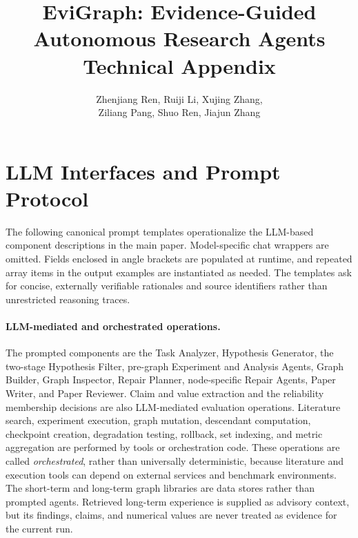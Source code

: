 
\setcounter{secnumdepth}{2}

\title{EviGraph: Evidence-Guided Autonomous Research Agents\\Technical Appendix}

\author{
    Zhenjiang Ren, Ruiji Li, Xujing Zhang,\\
    Ziliang Pang, Shuo Ren, Jiajun Zhang
}



\maketitle

\appendix
\fi

\ifappendixStandalone
  \newcommand{\mainref}[1]{\ref{main-#1}}
  \def\finishAppendixDocument{}
\else
  \newcommand{\mainref}[1]{\ref{#1}}
  \let\finishAppendixDocument\relax
\fi

\section{LLM Interfaces and Prompt Protocol}
\label{app:prompt-protocol}

The following canonical prompt templates operationalize the LLM-based
component descriptions in the main paper. Model-specific chat wrappers are omitted.
Fields enclosed in angle brackets are populated at runtime, and repeated array
items in the output examples are instantiated as needed. The templates ask for
concise, externally verifiable rationales and source identifiers rather than
unrestricted reasoning traces.

\paragraph{LLM-mediated and orchestrated operations.}
The prompted components are the Task Analyzer, Hypothesis Generator, the
two-stage Hypothesis Filter, pre-graph Experiment and Analysis Agents, Graph
Builder, Graph Inspector, Repair Planner, node-specific Repair Agents, Paper
Writer, and Paper Reviewer. Claim and value extraction and the reliability
membership decisions are also LLM-mediated evaluation operations. Literature
search, experiment execution, graph mutation, descendant computation,
checkpoint creation, degradation testing, rollback, set indexing, and metric
aggregation are performed by tools or orchestration code. These operations are
called \emph{orchestrated}, rather than universally deterministic, because
literature and execution tools can depend on external services and benchmark
environments. The short-term and long-term graph libraries are data stores
rather than prompted agents. Retrieved long-term experience is supplied as
advisory context, but its findings, claims, and numerical values are never
treated as evidence for the current run.

